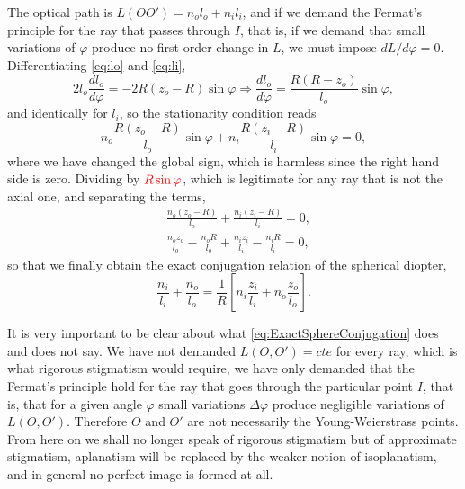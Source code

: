                 The optical path is $L(OO') = n_ol_o + n_il_i$, and if we demand the Fermat's principle for the ray that passes through $I$, that is, if we demand that small variations of $\varphi$ produce no first order change in $L$, we must impose $dL/d\varphi = 0$. Differentiating \ref{eq:lo} and \ref{eq:li},
                \begin{equation*}
                    2l_o\frac{dl_o}{d\varphi} = -2R\left( z_o-R \right)\sin\varphi \Longrightarrow \frac{dl_o}{d\varphi} = \frac{R\left( R-z_o \right)}{l_o}\sin\varphi,
                \end{equation*}
                and identically for $l_i$, so the stationarity condition reads
                \begin{equation}\label{eq:FermatSphere}
                    n_o\frac{R\left( z_o-R \right)}{l_o}\sin\varphi + n_i\frac{R\left( z_i-R \right)}{l_i}\sin\varphi = 0,
                \end{equation}
                where we have changed the global sign, which is harmless since the right hand side is zero. Dividing by ${\color{red}R\sin\varphi}$, which is legitimate for any ray that is not the axial one, and separating the terms,
                \begin{align*}
                    & \frac{n_o\left(z_o-R\right)}{l_o} + \frac{n_i\left(z_i-R\right)}{l_i} = 0,\\
                    & \frac{n_oz_o}{l_o} - \frac{n_oR}{l_o} + \frac{n_iz_i}{l_i} - \frac{n_iR}{l_i} = 0,
                \end{align*}
                so that we finally obtain the exact conjugation relation of the spherical diopter,
                \begin{equation}\label{eq:ExactSphereConjugation}
                    \frac{n_i}{l_i} + \frac{n_o}{l_o} = \frac{1}{R}\left[ n_i\frac{z_i}{l_i} + n_o\frac{z_o}{l_o} \right].
                \end{equation}

                It is very important to be clear about what \ref{eq:ExactSphereConjugation} does and does not say. We have not demanded $L(O,O') = cte$ for every ray, which is what rigorous stigmatism would require, we have only demanded that the Fermat's principle hold for the ray that goes through the particular point $I$, that is, that for a given angle $\varphi$ small variations $\Delta\varphi$ produce negligible variations of $L(O,O')$. Therefore $O$ and $O'$ are not necessarily the Young-Weierstrass points. From here on we shall no longer speak of rigorous stigmatism but of approximate stigmatism, aplanatism will be replaced by the weaker notion of isoplanatism, and in general no perfect image is formed at all.


